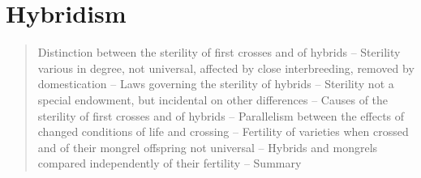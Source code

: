 \chapter{Hybridism}

\begin{quotation}
Distinction between the sterility of first crosses and of hybrids -- Sterility various in degree, not universal, affected by close interbreeding, removed by domestication -- Laws governing the sterility of hybrids -- Sterility not a special endowment, but incidental on other differences -- Causes of the sterility of first crosses and of hybrids -- Parallelism between the effects of changed conditions of life and crossing -- Fertility of varieties when crossed and of their mongrel offspring not universal -- Hybrids and mongrels compared independently of their fertility -- Summary
\end{quotation}

